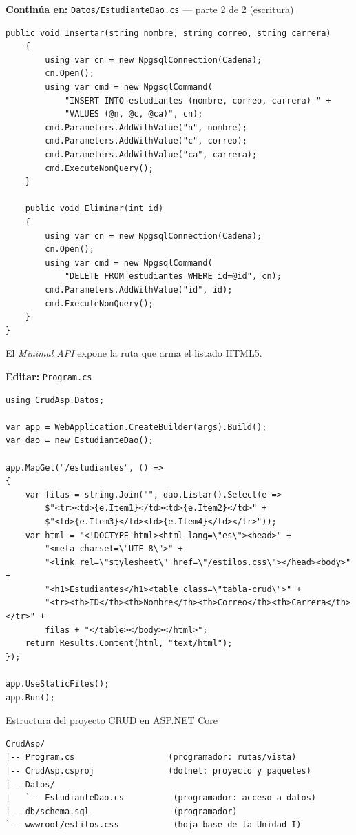 {\small\textbf{Continúa en:} \texttt{Datos/EstudianteDao.cs} --- parte 2 de 2 (escritura)}
\begin{lstlisting}[style=cs,caption={EstudianteDao.cs --- parte 2: insertar, actualizar, eliminar},label={lst:c6-asp-b}]
    public void Insertar(string nombre, string correo, string carrera)
    {
        using var cn = new NpgsqlConnection(Cadena);
        cn.Open();
        using var cmd = new NpgsqlCommand(
            "INSERT INTO estudiantes (nombre, correo, carrera) " +
            "VALUES (@n, @c, @ca)", cn);
        cmd.Parameters.AddWithValue("n", nombre);
        cmd.Parameters.AddWithValue("c", correo);
        cmd.Parameters.AddWithValue("ca", carrera);
        cmd.ExecuteNonQuery();
    }

    public void Eliminar(int id)
    {
        using var cn = new NpgsqlConnection(Cadena);
        cn.Open();
        using var cmd = new NpgsqlCommand(
            "DELETE FROM estudiantes WHERE id=@id", cn);
        cmd.Parameters.AddWithValue("id", id);
        cmd.ExecuteNonQuery();
    }
}
\end{lstlisting}

El \emph{Minimal API} expone la ruta que arma el listado HTML5.

{\small\textbf{Editar:} \texttt{Program.cs}}
\begin{lstlisting}[style=cs,caption={Program.cs --- vista de listado},label={lst:c6-asp-prog}]
using CrudAsp.Datos;

var app = WebApplication.CreateBuilder(args).Build();
var dao = new EstudianteDao();

app.MapGet("/estudiantes", () =>
{
    var filas = string.Join("", dao.Listar().Select(e =>
        $"<tr><td>{e.Item1}</td><td>{e.Item2}</td>" +
        $"<td>{e.Item3}</td><td>{e.Item4}</td></tr>"));
    var html = "<!DOCTYPE html><html lang=\"es\"><head>" +
        "<meta charset=\"UTF-8\">" +
        "<link rel=\"stylesheet\" href=\"/estilos.css\"></head><body>" +
        "<h1>Estudiantes</h1><table class=\"tabla-crud\">" +
        "<tr><th>ID</th><th>Nombre</th><th>Correo</th><th>Carrera</th></tr>" +
        filas + "</table></body></html>";
    return Results.Content(html, "text/html");
});

app.UseStaticFiles();
app.Run();
\end{lstlisting}

\begin{cajaejemplo}{Estructura del proyecto CRUD en ASP.NET Core}
\begin{lstlisting}[style=shell,caption={Estructura del CRUD ASP.NET Core},label={lst:c6-asp-tree}]
CrudAsp/
|-- Program.cs                   (programador: rutas/vista)
|-- CrudAsp.csproj               (dotnet: proyecto y paquetes)
|-- Datos/
|   `-- EstudianteDao.cs          (programador: acceso a datos)
|-- db/schema.sql                 (programador)
`-- wwwroot/estilos.css           (hoja base de la Unidad I)
\end{lstlisting}
\end{cajaejemplo}

